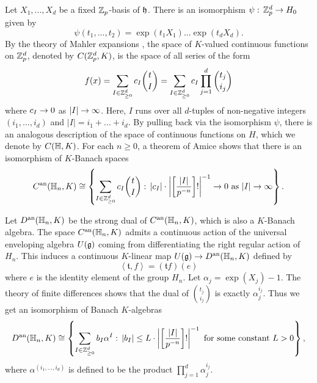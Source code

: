 \documentclass[10pt]{amsart}
\begin{document}
Let $X_{1},...,X_{d}$ be a fixed $\mathbb{Z}_{p}$-basis of $\mathfrak{h}$. There is an isomorphism $\psi :\,\mathbb{Z}_{p}^{d} \rightarrow H_{0}$ given by \begin{equation}\label{eqn:psi}
	\psi (t_{1},...,t_{2}) = \exp(t_{1}X_{1})...\exp(t_{d}X_{d}).
\end{equation} By the theory of Mahler expansions \cite{Lazard}, the space of $K$-valued continuous functions on $\mathbb{Z}_{p}^{d}$, denoted by $C(\mathbb{Z}_{p}^{d},K)$, is the space of all series of the form \[
	f(x)=\sum_{I\in \mathbb{Z}_{\geq 0}^{d}} c_{I} \binom{t}{I} =\sum_{I\in \mathbb{Z}_{\geq 0}^{d}} c_{I} \prod_{j=1}^{d} \binom{t_{j}}{i_{j}}
\] where $c_{I}\rightarrow 0$ as $|I| \rightarrow \infty$. Here, $I$ runs over all $d$-tuples of non-negative integers $(i_{1},...,i_{d})$ and $|I|=i_{1}+...+i_{d}$. By pulling back via the isomorphism $\psi$, there is an analogous description of the space of continuous functions on $H$, which we denote by $C(\mathbb{H},K)$. For each $n\geq 0$, a theorem of Amice \cite[III.1.3.9]{Amice} shows that there is an isomorphism of $K$-Banach spaces \[ 
	C^{\textnormal{an}}(\mathbb{H}_{n},K)\cong\left\{\sum_{I\in \mathbb{Z}_{\geq 0}^{d}} c_{I} \binom{t}{I}:\, |c_{I}|\cdot\left|\left[\frac{|I|}{p^{-n}}\right]!\right|^{-1}\rightarrow 0 \textnormal{ as } |I|\rightarrow \infty \right\}.
\] 

Let $D^{\textnormal{an}}(\mathbb{H}_{n},K)$ be the strong dual of $C^{\textnormal{an}}(\mathbb{H}_{n},K)$, which is also a $K$-Banach algebra. The space $C^{\textnormal{an}}(\mathbb{H}_{n},K)$ admits a continuous action of the universal enveloping algebra $U(\mathfrak{g})$ coming from differentiating the right regular action of $H_{n}$. This induces a continuous $K$-linear map $U(\mathfrak{g})\rightarrow D^{\textnormal{an}}(\mathbb{H}_{n},K)$ defined by \[
    \left<\mathfrak{t},f\right> = (\mathfrak{t}f)(e)
\]
where $e$ is the identity element of the group $H_{n}$. Let $\alpha_{j}=\exp(X_{j})-1$. The theory of finite differences shows that the dual of $\binom{t_j}{i_{j}}$ is exactly $\alpha_{j}^{i_{j}}$. Thus we get an isomorphism of Banach $K$-algebras \begin{equation}\label{eqn:dist1}
    D^{\textnormal{an}}(\mathbb{H}_{n},K)\cong \left\{\sum_{I\in \mathbb{Z}_{\geq 0}^{d}} b_{I} \alpha^{I}:\, |b_{I}|\leq L\cdot\left|\left[\frac{|I|}{p^{-n}}\right]!\right|^{-1} \textnormal{ for some constant } L>0 \right\},
\end{equation} where $\alpha^{(i_{1},...,i_{d})}$ is defined to be the product $\prod_{j=1}^{d}\alpha_{j}^{i_{j}}$.
\end{document}
